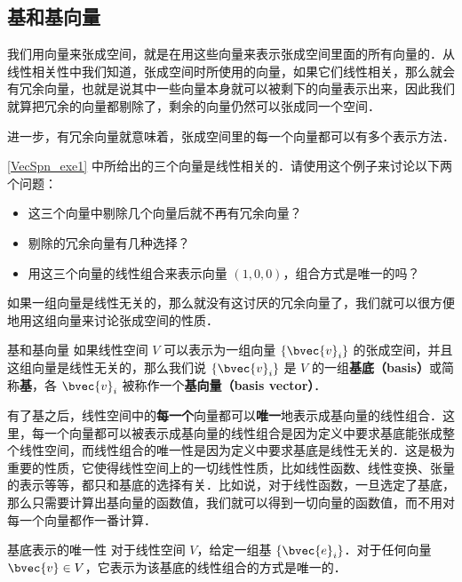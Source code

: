 \subsection{基和基向量}

我们用向量来张成空间，就是在用这些向量来表示张成空间里面的所有向量的．从线性相关性中我们知道，张成空间时所使用的向量，如果它们线性相关，那么就会有冗余向量，也就是说其中一些向量本身就可以被剩下的向量表示出来，因此我们就算把冗余的向量都剔除了，剩余的向量仍然可以张成同一个空间．

进一步，有冗余向量就意味着，张成空间里的每一个向量都可以有多个表示方法．

\begin{exercise}{}
\autoref{VecSpn_exe1} 中所给出的三个向量是线性相关的．请使用这个例子来讨论以下两个问题：
\begin{itemize}
\item 这三个向量中剔除几个向量后就不再有冗余向量？
\item 剔除的冗余向量有几种选择？
\item 用这三个向量的线性组合来表示向量 $(1,0,0)$，组合方式是唯一的吗？
\end{itemize}
\end{exercise}


如果一组向量是线性无关的，那么就没有这讨厌的冗余向量了，我们就可以很方便地用这组向量来讨论张成空间的性质．

\begin{definition}{基和基向量}\label{VecSpn_def2}
如果线性空间 $V$ 可以表示为一组向量 $\{\bvec{v}_i\}$ 的张成空间，并且这组向量是线性无关的，那么我们说 $\{\bvec{v}_i\}$ 是 $V$ 的一组\textbf{基底（basis）}或简称\textbf{基}，各 $\bvec{v}_i$ 被称作一个\textbf{基向量（basis vector）}．
\end{definition}

有了基之后，线性空间中的\textbf{每一个}向量都可以\textbf{唯一}地表示成基向量的线性组合．这里，每一个向量都可以被表示成基向量的线性组合是因为定义中要求基底能张成整个线性空间，而线性组合的唯一性是因为定义中要求基底是线性无关的．这是极为重要的性质，它使得线性空间上的一切线性性质，比如线性函数、线性变换、张量的表示等等，都只和基底的选择有关．比如说，对于线性函数，一旦选定了基底，那么只需要计算出基向量的函数值，我们就可以得到一切向量的函数值，而不用对每一个向量都作一番计算．

\begin{theorem}{基底表示的唯一性}\label{VecSpn_the1}
对于线性空间 $V$，给定一组基 $\{\bvec{e}_i\}$．对于任何向量 $\bvec{v}\in V$，它表示为该基底的线性组合的方式是唯一的．
\end{theorem}

